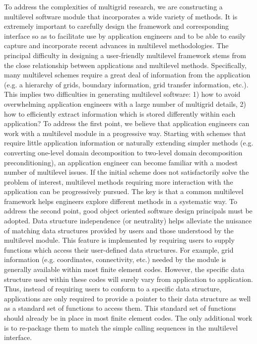 \documentclass[11pt]{article}
\begin{document}
To address the complexities of multigrid research, we are constructing a
multilevel software module that incorporates a wide variety of methods. It is
extremely important to carefully design the framework and corresponding
interface so as to facilitate use by application engineers and to be able to
easily capture and incorporate recent advances in multilevel methodologies.
The principal difficulty in designing a user-friendly multilevel framework
stems from the close relationship between applications and multilevel
methods. Specifically, many multilevel schemes require a great deal of
information from the application (e.g. a hierarchy of grids, boundary
information, grid transfer information, etc.).  This implies two difficulties
in generating multilevel software: 1) how to avoid overwhelming application
engineers with a large number of multigrid details, 2) how to efficiently
extract information which is stored differently within each application?
To address the first point, we believe that application engineers can work
with a multilevel module in a progressive way. Starting with schemes that
require little application information or naturally extending simpler methods
(e.g. converting one-level domain decomposition to two-level domain
decomposition preconditioning), an application
engineer can become familiar with a modest number of multilevel issues.
If the initial scheme does not satisfactorily solve the problem of interest,
multilevel methods requiring more interaction with the application can be
progressively pursued. The key is that a common multilevel framework helps
engineers explore different methods in a systematic way.
To address the second point, good object oriented software design
principals must be adopted.
Data structure independence (or neutrality) helps alleviate the nuisance
of matching data structures provided by users and those understood by
the multilevel module.  This feature is implemented by requiring users
to supply functions which access their user-defined data structures.
For example, grid information (e.g. coordinates, connectivity, etc.)
needed by the module is generally available within most finite element codes.
However, the specific data structure used within these
codes will surely vary from application to application. Thus, instead of
requiring users to conform to a specific data structure, applications
are only required to provide a pointer to their data structure as well as
a standard set of functions to access them.  This standard
set of functions should already be in place in most finite element codes.
The only additional work is to re-package them to match the simple calling
sequences in the multilevel interface.
\end{document}
